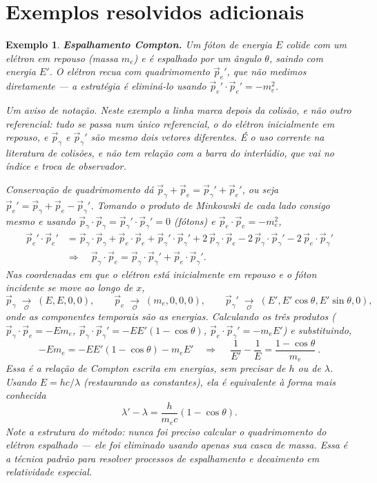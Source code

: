 \documentclass[12pt,a4paper,oneside]{book}
\theoremstyle{rgplain}
\newtheorem{example}{Exemplo}[chapter]
\theoremstyle{rgremark}
\newcommand{\obs}{\mathcal{O}}
\newcommand{\temcomp}[1]{\;\underset{#1}{\longrightarrow}\;}
\begin{document}
\clearpage
\section{Exemplos resolvidos adicionais}

\begin{example}
\textbf{Espalhamento Compton.} Um fóton de energia $E$ colide com um elétron
em repouso (massa $m_e$) e é espalhado por um ângulo $\theta$, saindo com
energia $E'$. O elétron recua com quadrimomento $\vec p_e{}'$, que não medimos
diretamente --- a estratégia é eliminá-lo usando
$\vec p_e{}'\cdot\vec p_e{}'=-m_e^2$.

\emph{Um aviso de notação.} Neste exemplo a linha marca \emph{depois da
colisão}, e não outro referencial: tudo se passa num único referencial, o do
elétron inicialmente em repouso, e $\vec p_\gamma$ e $\vec p_\gamma{}'$ são
mesmo dois vetores diferentes. É o uso corrente na literatura de colisões, e
não tem relação com a barra do interlúdio, que vai no \emph{índice} e troca
de observador.

Conservação de quadrimomento dá
$\vec p_\gamma+\vec p_e=\vec p_\gamma{}'+\vec p_e{}'$, ou seja
$\vec p_e{}'=\vec p_\gamma+\vec p_e-\vec p_\gamma{}'$. Tomando o produto de
Minkowski de cada lado consigo mesmo e usando
$\vec p_\gamma\cdot\vec p_\gamma=\vec p_\gamma{}'\cdot\vec p_\gamma{}'=0$
(fótons) e $\vec p_e\cdot\vec p_e=-m_e^2$,
\begin{align*}
  \vec p_e{}'\cdot\vec p_e{}' &=
    \vec p_\gamma\cdot\vec p_\gamma+\vec p_e\cdot\vec p_e
    +\vec p_\gamma{}'\cdot\vec p_\gamma{}'
    +2\,\vec p_\gamma\cdot\vec p_e
    -2\,\vec p_\gamma\cdot\vec p_\gamma{}'
    -2\,\vec p_e\cdot\vec p_\gamma{}'\\
  &\Longrightarrow\quad
  \vec p_\gamma\cdot\vec p_e=\vec p_\gamma\cdot\vec p_\gamma{}'
   +\vec p_e\cdot\vec p_\gamma{}'.
\end{align*}
Nas coordenadas em que o elétron está inicialmente em repouso e o fóton
incidente se move ao longo de $x$,
\[
  \vec p_\gamma\temcomp{\obs}(E,E,0,0),\qquad
  \vec p_e\temcomp{\obs}(m_e,0,0,0),\qquad
  \vec p_\gamma{}'\temcomp{\obs}(E',E'\cos\theta,E'\sin\theta,0),
\]
onde as componentes temporais são as energias. Calculando os três produtos
($\vec p_\gamma\cdot\vec p_e=-Em_e$,
$\vec p_\gamma\cdot\vec p_\gamma{}'=-EE'(1-\cos\theta)$,
$\vec p_e\cdot\vec p_\gamma{}'=-m_eE'$) e substituindo,
\[
  -Em_e=-EE'(1-\cos\theta)-m_eE'
  \quad\Longrightarrow\quad
  \boxed{\ \frac{1}{E'}-\frac{1}{E}=\frac{1-\cos\theta}{m_e}\ }.
\]
Essa é a relação de Compton escrita em energias, sem precisar de $h$ ou de
$\lambda$. Usando $E=hc/\lambda$ (restaurando as constantes), ela é
equivalente à forma mais conhecida
\[
  \lambda'-\lambda=\frac{h}{m_ec}(1-\cos\theta).
\]
Note a estrutura do método: nunca foi preciso calcular o quadrimomento do
elétron espalhado --- ele foi eliminado usando apenas sua casca de massa. Essa
é a técnica padrão para resolver processos de espalhamento e decaimento em
relatividade especial.
\end{example}
\end{document}
